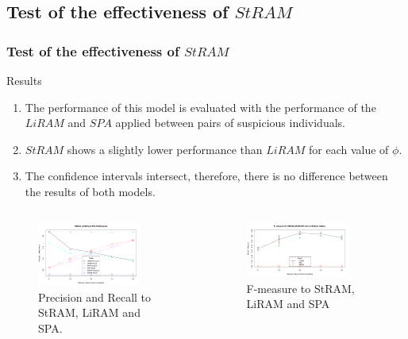 \documentclass[aspectratio=169]{beamer}
\begin{document}
\subsection[Test of the effectiveness of $StRAM$]{Test of the effectiveness of $StRAM$}
\begin{frame}
\frametitle{Test of the effectiveness of $StRAM$}
\begin{block}{Results}
  \footnotesize
  \begin{enumerate}
    \item The performance of this model is evaluated with the performance of the $LiRAM$\cite{Troncoso201} and $SPA$\cite{xu204} applied between pairs of suspicious individuals.
    \item $StRAM$ shows a slightly lower performance than $LiRAM$ for each value of $\phi$.
    \item The confidence intervals intersect, therefore, there is no difference between the results of both models.
  \end{enumerate}
\end{block}
\begin{columns}
  \begin{figure}[ht]
    \centering
    \includegraphics[width=0.8\textwidth]{images/comparation.pdf}
    \caption{\footnotesize Precision and Recall to StRAM, LiRAM and SPA.}
  \end{figure}
  \begin{figure}[ht]
    \centering
    \includegraphics[width=0.8\textwidth]{images/confidence-interval.pdf}
    \caption{\footnotesize F-measure to StRAM, LiRAM and SPA}
  \end{figure}
\end{columns}
\end{frame}
\end{document}
